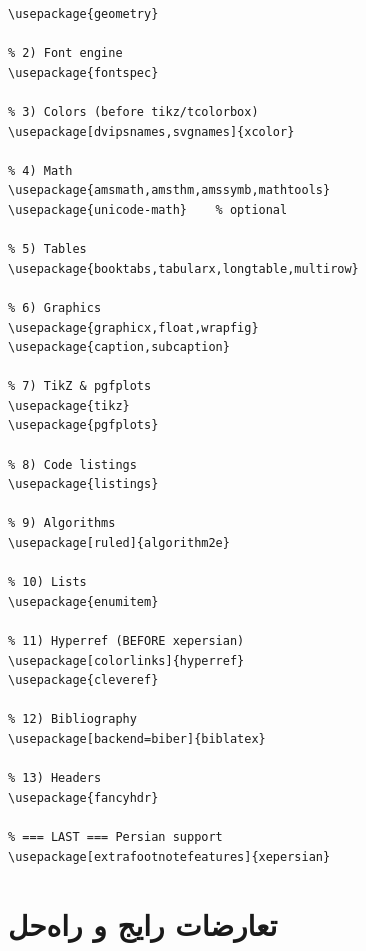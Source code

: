 \documentclass[12pt,a4paper,twoside]{book}
\begin{document}
\begin{latin}
\begin{lstlisting}[language={[LaTeX]TeX},
  caption={ترتیب بارگذاری پکیج‌ها},
  label={lst:pkg-order}]
% 1) Page geometry
\usepackage{geometry}

% 2) Font engine
\usepackage{fontspec}

% 3) Colors (before tikz/tcolorbox)
\usepackage[dvipsnames,svgnames]{xcolor}

% 4) Math
\usepackage{amsmath,amsthm,amssymb,mathtools}
\usepackage{unicode-math}    % optional

% 5) Tables
\usepackage{booktabs,tabularx,longtable,multirow}

% 6) Graphics
\usepackage{graphicx,float,wrapfig}
\usepackage{caption,subcaption}

% 7) TikZ & pgfplots
\usepackage{tikz}
\usepackage{pgfplots}

% 8) Code listings
\usepackage{listings}

% 9) Algorithms
\usepackage[ruled]{algorithm2e}

% 10) Lists
\usepackage{enumitem}

% 11) Hyperref (BEFORE xepersian)
\usepackage[colorlinks]{hyperref}
\usepackage{cleveref}

% 12) Bibliography
\usepackage[backend=biber]{biblatex}

% 13) Headers
\usepackage{fancyhdr}

% === LAST === Persian support
\usepackage[extrafootnotefeatures]{xepersian}
\end{lstlisting}
\end{latin}

\section{تعارضات رایج و راه‌حل}
\label{sec:conflicts}
\end{document}
